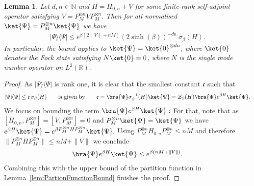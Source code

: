 \documentclass[11pt]{amsart}
\newcommand{\1}{\mathbbm{1}}
\newcommand{\kb}[1]{|#1\rangle\!\langle#1|}
\newcommand{\R}{\mathbb{R}}
\newcommand{\N}{\mathbb{N}}
\theoremstyle{plain}
\newtheorem{lemma}[theorem]{Lemma}
\theoremstyle{definition}
\theoremstyle{remark}
\numberwithin{equation}{section}
\begin{document}
\begin{lemma}
\label{lem:cScalingFiniteRank}
Let $d,n\in\N$ and $H =  H_{0,n} +V$ for some finite-rank self-adjoint operator satisfying $V = P^{\otimes n}_{M}VP^{\otimes n}_{M}.$
Then for all normalised $\ket{\Psi} = P^{\otimes n}_{M}\ket{\Psi}$ we have
\begin{align*}
    \kb{\Psi} \le e^{\beta(2 \|V\|+nM)} (2\sinh(\beta))^{-dn} \ \sigma_\beta(H).
\end{align*}
In particular, the bound applies to  $\ket{\Psi} = \ket{0}^{\otimes dn},$ where $\ket{0}$ denotes the Fock state  satisfying $N\ket{0} =0$, where $N$ is the single mode number operator on $L^2(\R).$  
\end{lemma}
\begin{proof}
As $\kb{\Psi}$ is rank one, it is clear that the smallest constant $\mathfrak{c}$ such that 
\begin{align*}
\kb{\Psi} \le  \mathfrak{c}\, \sigma_\beta(H)  \qquad\text{is given by}  \qquad
\mathfrak{c} = \bra{\Psi}\sigma^{-1}_\beta(H)\ket{\Psi} = \mathcal{Z}_\beta(H) \bra{\Psi}e^{\beta H}\ket{\Psi}.
\end{align*}
We focus on bounding the term $\bra{\Psi}e^{\beta H}\ket{\Psi}:$
For that, note that as $[H_{0,n},P^{\otimes n}_{M}] = [V,P^{\otimes n}_{M}] = 0$ and $P^{\otimes n}_{M} \ket{\Psi} = \ket{\Psi}$ we have $e^{\beta H}\ket{\Psi} = e^{\beta P^{\otimes n}_{M}HP^{\otimes n}_{M}}\ket{\Psi}.$ Using $P^{\otimes n}_{M}H_{0,n}P^{\otimes n}_{M} \le nM$ and therefore $\|P^{\otimes n}_{M}HP^{\otimes n}_{M}\| \le nM +\|V\|$ we conclude
\begin{align*}
\bra{\Psi}e^{\beta H}\ket{\Psi} \le e^{\beta(nM + \|V\|)}.
\end{align*}
Combining this with the upper bound of the partition function in Lemma~\ref{lem:PartionFunctionBound} finishes the proof.
\end{proof}
\end{document}
